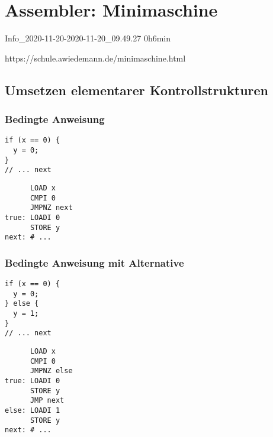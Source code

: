 \documentclass{lehramt-informatik-haupt}
\begin{document}

\chapter{Assembler: Minimaschine}

Info\_2020-11-20-2020-11-20\_09.49.27 0h6min

https://schule.awiedemann.de/minimaschine.html

%

\section{Umsetzen elementarer Kontrollstrukturen}

%

\subsection{Bedingte Anweisung}

\begin{multicols}{2}
\begin{verbatim}
if (x == 0) {
  y = 0;
}
// ... next
\end{verbatim}

\columnbreak

\begin{verbatim}
      LOAD x
      CMPI 0
      JMPNZ next
true: LOADI 0
      STORE y
next: # ...
\end{verbatim}
\end{multicols}

%

\subsection{Bedingte Anweisung mit Alternative}

\begin{multicols}{2}
\begin{verbatim}
if (x == 0) {
  y = 0;
} else {
  y = 1;
}
// ... next
\end{verbatim}

\columnbreak

\begin{verbatim}
      LOAD x
      CMPI 0
      JMPNZ else
true: LOADI 0
      STORE y
      JMP next
else: LOADI 1
      STORE y
next: # ...
\end{verbatim}
\end{multicols}

\literatur
\end{document}

